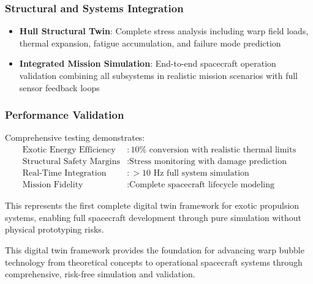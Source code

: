 \documentclass[11pt]{article}
\begin{document}
\subsubsection{Structural and Systems Integration}
\begin{itemize}
\item \textbf{Hull Structural Twin}: Complete stress analysis including warp field loads, thermal expansion, fatigue accumulation, and failure mode prediction
\item \textbf{Integrated Mission Simulation}: End-to-end spacecraft operation validation combining all subsystems in realistic mission scenarios with full sensor feedback loops
\end{itemize}

\subsubsection{Performance Validation}
Comprehensive testing demonstrates:
\begin{align}
\text{Exotic Energy Efficiency} &: 10\% \text{ conversion with realistic thermal limits} \\
\text{Structural Safety Margins} &: \text{Stress monitoring with damage prediction} \\
\text{Real-Time Integration} &: >10 \text{ Hz full system simulation} \\
\text{Mission Fidelity} &: \text{Complete spacecraft lifecycle modeling}
\end{align}

This represents the first complete digital twin framework for exotic propulsion systems, enabling full spacecraft development through pure simulation without physical prototyping risks.

This digital twin framework provides the foundation for advancing warp bubble technology from theoretical concepts to operational spacecraft systems through comprehensive, risk-free simulation and validation.
\end{document}
